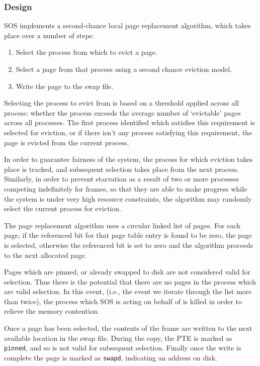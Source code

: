 \documentclass[a4paper,12pt]{article}
\begin{document}
\subsubsection{Design}
SOS implements a second-chance local page replacement algorithm, which takes
place over a number of steps:

\begin{enumerate}
\item Select the process from which to evict a page.
\item Select a page from that process using a second chance eviction model.
\item Write the page to the swap file.
\end{enumerate}

Selecting the process to evict from is based on a threshold applied across all
process: whether the process exceeds the average number of `evictable' pages
across all processes.  The first process identified which satisfies this
requirement is selected for eviction, or if there isn't any process satisfying
this requirement, the page is evicted from the current process.

In order to guarantee fairness of the system, the process for which eviction
takes place is tracked, and subsequent selection takes place from the next
process.  Similarly, in order to prevent starvation as a result of two or more
processes competing indefinitely for frames, so that they are able to make
progress while the system is under very high resource constraints, the
algorithm may randomly select the current process for eviction.

The page replacement algorithm uses a circular linked list of pages.  For each
page, if the referenced bit for that page table entry is found to be zero, the
page is selected, otherwise the referenced bit is set to zero and the
algorithm proceeds to the next allocated page.

Pages which are pinned, or already swapped to disk are not considered valid
for selection.  Thus there is the potential that there are no pages in the
process which are valid selection.  In this event, (i.e., the event we iterate
through the list more than twice), the process which SOS is acting on behalf
of is killed in order to relieve the memory contention.

Once a page has been selected, the contents of the frame are written to the
next available location in the swap file.  During the copy, the PTE is marked
as \texttt{pinned}, and so is not valid for subsequent selection.  Finally
once the write is complete the page is marked as \texttt{swapd}, indicating an
address on disk.
\end{document}
